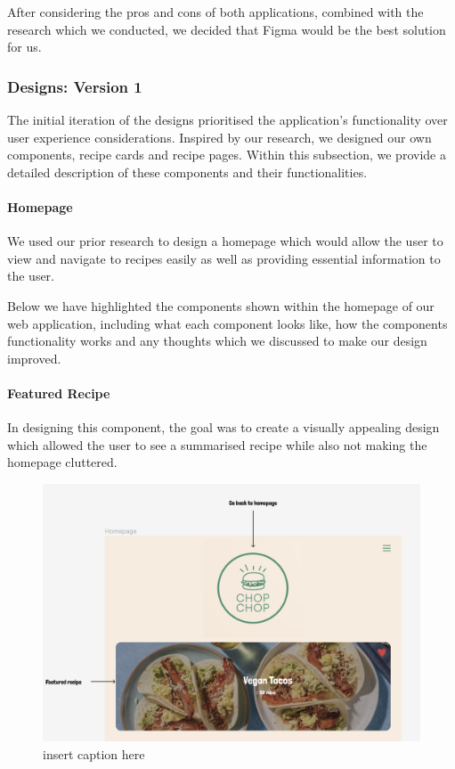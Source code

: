 \documentclass{article}
\begin{document}
After considering the pros and cons of both applications, combined with the research which we conducted, we decided that Figma would be the best solution for us.

\subsubsection{Designs: Version 1}
The initial iteration of the designs prioritised the application's functionality over user experience considerations. Inspired by our research, we designed our own components, recipe cards and recipe pages. Within this subsection, we provide a detailed description of these components and their functionalities.

\paragraph{Homepage}
We used our prior research to design a homepage which would allow the user to view and navigate to recipes easily as well as providing essential information to the user. 

Below we have highlighted the components shown within the homepage of our web application, including what each component looks like, how the components functionality works and any thoughts which we discussed to make our design improved.

\paragraph{Featured Recipe}
In designing this component, the goal was to create a visually appealing design which allowed the user to see a summarised recipe while also not making the homepage cluttered.

\begin{figure}[htbp]
  \includegraphics[width=1.0\textwidth]{assets/Version 1 Featured Recipe.png}
  \centering
  \caption{insert caption here}
\end{figure}
\end{document}
